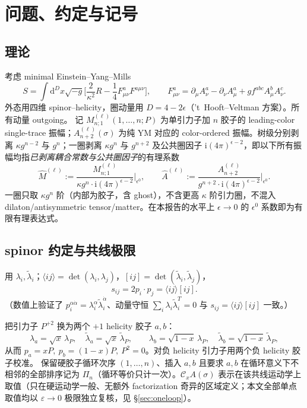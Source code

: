 \documentclass[11pt]{article}
\newcommand{\Cx}{\mathcal{C}_x}
\newcommand{\ii}{\mathrm{i}}
\newcommand{\dd}{\mathrm{d}}
\newcommand{\ab}[1]{\langle #1\rangle}
\newcommand{\sq}[1]{[#1]}
\newcommand{\Mhat}{\widehat{M}}
\newcommand{\Ahat}{\widehat{A}}
\newcommand{\Pt}{P}
\begin{document}
\tableofcontents

\section{问题、约定与记号}
\label{sec:setup}

\subsection{理论}
考虑 minimal Einstein--Yang--Mills
\begin{equation}
S=\int \dd^D x\sqrt{-g}\Big[\frac{2}{\kappa^2}R-\frac14F^a_{\mu\nu}F^{a\mu\nu}\Big],\qquad
F^a_{\mu\nu}=\partial_\mu A^a_\nu-\partial_\nu A^a_\mu+g f^{abc}A^b_\mu A^c_\nu .
\end{equation}
外态用四维 spinor--helicity，圈动量用 $D=4-2\epsilon$（'t~Hooft--Veltman 方案）。所有动量 outgoing。
记 $M^{(\ell)}_{n;1}(1,\dots,n;\Pt)$ 为单引力子加 $n$ 胶子的 leading-color single-trace 振幅；$A^{(\ell)}_{n+2}(\sigma)$ 为纯 YM 对应的 color-ordered 振幅。树级分别剥离 $\kappa g^{n-2}$ 与 $g^n$；一圈剥离 $\kappa g^n$ 与 $g^{n+2}$ 及公共圈因子 $\ii(4\pi)^{\epsilon-2}$，即以下所有振幅均指\emph{已剥离耦合常数与公共圈因子}的有理系数
\begin{equation}
\Mhat^{(\ell)}:=\frac{M^{(\ell)}_{n;1}}{\kappa g^{n}\cdot \ii(4\pi)^{\epsilon-2}}\Big|_{\epsilon^0},\qquad
\Ahat^{(\ell)}:=\frac{A^{(\ell)}_{n+2}}{g^{n+2}\cdot \ii(4\pi)^{\epsilon-2}}\Big|_{\epsilon^0}.
\label{eq:stripped}
\end{equation}
一圈只取 $\kappa g^n$ 阶（内部为胶子，含 ghost），不含更高 $\kappa$ 阶引力圈，不混入 dilaton/antisymmetric tensor/matter。在本报告的水平上 $\epsilon\to0$ 的 $\epsilon^0$ 系数即为有限有理表达式。

\subsection{spinor 约定与共线极限}
用 $\lambda_i,\widetilde\lambda_i$；$\ab{ij}=\det(\lambda_i,\lambda_j)$，$\sq{ij}=\det(\widetilde\lambda_i,\widetilde\lambda_j)$，
\begin{equation}
s_{ij}=2p_i\!\cdot\! p_j=\ab{ij}\sq{ij}.
\end{equation}
（数值上验证了 $p_i^{\alpha\dot\alpha}=\lambda_i^\alpha\widetilde\lambda_i^{\dot\alpha}$、动量守恒 $\sum_i\lambda_i\widetilde\lambda_i^T=0$ 与 $s_{ij}=\ab{ij}\sq{ij}$ 一致。）

把引力子 $\Pt^{+2}$ 换为两个 $+1$ helicity 胶子 $a,b$：
\begin{equation}
\lambda_a=\sqrt{x}\,\lambda_{\Pt},\quad \widetilde\lambda_a=\sqrt{x}\,\widetilde\lambda_{\Pt},\qquad
\lambda_b=\sqrt{1-x}\,\lambda_{\Pt},\quad \widetilde\lambda_b=\sqrt{1-x}\,\widetilde\lambda_{\Pt},
\end{equation}
从而 $p_a=x\Pt,\ p_b=(1-x)\Pt,\ \Pt^2=0$。对负 helicity 引力子用两个负 helicity 胶子校准。
保留硬胶子循环次序 $(1,\dots,n)$、插入 $a,b$ 且要求 $a,b$ 在循环意义下不相邻的全部排序记为 $\Pi_n$（循环等价只计一次）。$\Cx A(\sigma)$ 表示在该共线运动学上取值（只在硬运动学一般、无额外 factorization 奇异的区域定义；本文全部单点取值均以 $\varepsilon\to0$ 极限独立复核，见 \S\ref{sec:oneloop}）。
\end{document}
